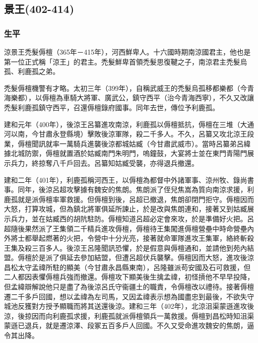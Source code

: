 
\subsection{景王\tiny(402-414)}

\subsubsection{生平}

涼景王禿髮傉檀（365年－415年），河西鮮卑人。十六國時期南涼國君主，他也是第一位正式稱「涼王」的君主。禿髮鮮卑首領禿髮思復鞬之子，南涼君主禿髮烏孤、利鹿孤之弟。

禿髮傉檀機警有才略。太初三年（399年），自稱武威王的禿髮烏孤移都樂都（今青海樂都），以傉檀為車騎大將軍、廣武公，鎮守西平（治今青海西寧），不久又改讓禿髮利鹿孤鎮守西平，召還傉檀錄府國事。同年去世，傳位予利鹿孤。

建和元年（400年），後涼王呂纂進攻南涼，利鹿孤以傉檀抵抗，傉檀在三堆（大通河以南，今甘肅永登縣境）擊敗後涼軍隊，殺二千多人。不久，呂纂又攻北涼王段業，傉檀聞訊就率一萬騎兵進襲後涼都城姑臧（今甘肅武威市）。當時呂纂弟呂緯據北城防禦，傉檀就置酒於姑臧南門朱明門，嗚鐘鼓，大宴將士並在東門青陽門展示兵力，終掠奪八千戶回去。呂纂知姑臧受襲，亦得退兵撤還。

建和二年（401年），利鹿孤稱河西王，以傉檀為都督中外諸軍事、涼州牧、錄尚書事。同年，後涼呂超攻擊據有魏安的焦朗。焦朗派了侄兒焦嵩為質向南涼求援，利鹿孤就是派傉檀率軍救援。但傉檀到後，呂超已撤退，焦朗卻閉門拒守。傉檀因而大怒，打算攻城，但為鎮北將軍俱延所諫止，於是改與焦朗連和，接著又到姑臧展示兵力，並在姑臧西的胡阬駐防。傉檀知道呂超必定會來攻，於是準備好火把。呂超隨後果然派了王集領二千精兵進攻傉檀，傉檀待王集闖進傉檀營壘中時命營壘內外將士都舉起燃著的火把，令營中十分光亮，接著就命軍隊進攻王集軍，絡終斬殺王集及殺三百多人。後涼王呂隆聞訊恐懼，於是假意與傉檀通和，並請他到苑內結盟。傉檀於是派了俱延去參加結盟，但遭呂超伏兵襲擊。傉檀因而大怒，進攻後涼昌松太守孟禕所駐的顯美（今甘肅永昌縣東南），呂隆雖派苟安國及石可救援，但二人都因表懼傉檀兵強而撤還。傉檀攻下顯美後生擒孟禕，初怪摃他不早早投降，但孟緯辯解說他只是盡了為後涼呂氏守衞疆土的職責，令傉檀改以禮待。接著傉檀遷二千多戶回國，想以孟禕為左司馬，又因孟禕表示想為國盡忠到最後，不欲失守城池反獲對方授予顯職而將其送還後涼。建和三年（402年），北涼沮渠蒙遜進攻後涼，後掠因而向利鹿孤求援，利鹿孤就派傉檀領兵一萬救援。傉檀到昌松時知沮渠蒙遜已退兵，就是遷涼澤、段冢五百多戶人回國。不久又受命進攻魏安的焦朗，逼令其出降。

